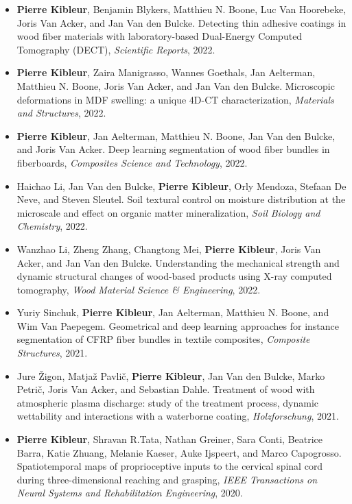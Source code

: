 \documentclass[oneside, english, 10pt, a4paper]{memoir}
\begin{document}
		\begin{itemize}    	    	
			\item \textbf{Pierre Kibleur}, Benjamin Blykers, Matthieu N. Boone, Luc Van Hoorebeke, Joris Van Acker, and Jan Van den Bulcke. Detecting thin adhesive coatings in wood fiber materials with laboratory-based Dual-Energy Computed Tomography (DECT), \emph{Scientific Reports}, 2022.
			
			\item  {\textbf{Pierre Kibleur}, Zaira Manigrasso, Wannes Goethals, Jan Aelterman, Matthieu N. Boone, Joris Van Acker, and Jan Van den Bulcke}. {Microscopic deformations in MDF swelling: a unique 4D-CT characterization}, \emph{Materials and Structures}, 2022.
				
			\item  {\textbf{Pierre Kibleur}, Jan Aelterman, Matthieu N. Boone, Jan Van den Bulcke, and Joris Van Acker}. {Deep learning segmentation of wood fiber bundles in fiberboards}, \emph{Composites Science and Technology},  2022.
			
			\item Haichao Li, Jan Van den Bulcke, \textbf{Pierre Kibleur}, Orly Mendoza, Stefaan De Neve, and Steven Sleutel. Soil textural control on moisture distribution at the microscale and effect on organic matter mineralization, \emph{Soil Biology and Chemistry}, 2022.
			
			\item {Wanzhao Li, Zheng Zhang, Changtong Mei, \textbf{Pierre Kibleur}, Joris Van Acker, and Jan Van den Bulcke}. {Understanding the mechanical strength and dynamic structural changes of wood-based products using X-ray computed tomography}, \emph{Wood Material Science {\&} Engineering}, 2022.
			
			\item {Yuriy Sinchuk, \textbf{Pierre Kibleur}, Jan Aelterman, Matthieu N. Boone, and Wim Van Paepegem}. {Geometrical and deep learning approaches for instance segmentation of CFRP fiber bundles in textile composites}, \emph{Composite Structures}, 2021.
			
			\item {Jure \v{Z}}igon, Matja{\v{z}} Pavli{\v{c}}, \textbf{Pierre Kibleur}, Jan Van den Bulcke, Marko Petri{\v{c}}, Joris Van Acker, and Sebastian Dahle. {Treatment of wood with atmospheric plasma discharge: study of the treatment process, dynamic wettability and interactions with a waterborne coating}, \emph{{Holzforschung}}, 2021.
			
			\item {\textbf{Pierre Kibleur}, Shravan R.Tata, Nathan Greiner, Sara Conti, Beatrice Barra, Katie Zhuang, Melanie Kaeser, Auke Ijspeert, and Marco Capogrosso}. {Spatiotemporal maps of proprioceptive inputs to the cervical spinal cord during three-dimensional reaching and grasping}, \emph{IEEE Transactions on Neural Systems and Rehabilitation Engineering}, 2020.
			

\end{itemize}
\end{document}
